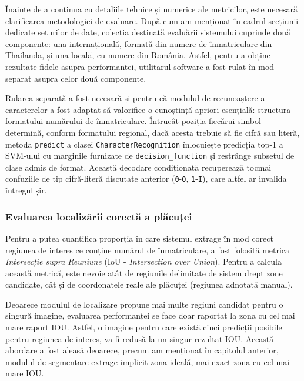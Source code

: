 Înainte de a continua cu detaliile tehnice și numerice ale metricilor, este necesară clarificarea metodologiei de evaluare. După cum am menționat în cadrul secțiunii dedicate seturilor de date, colecția destinată evaluării sistemului cuprinde două componente: una internațională, formată din numere de înmatriculare din Thailanda, și una locală, cu numere din România. Astfel, pentru a obține rezultate fidele asupra performanței, utilitarul software  a fost rulat în mod separat asupra celor două componente.

Rularea separată a fost necesară și pentru că modulul de recunoaștere a caracterelor a fost adaptat să valorifice o cunoștință apriori esențială: structura formatului numărului de înmatriculare. Întrucât poziția fiecărui simbol determină, conform formatului regional, dacă acesta trebuie să fie cifră sau literă, metoda \texttt{predict} a clasei \texttt{CharacterRecognition} înlocuiește predicția top-1 a SVM-ului cu marginile furnizate de \texttt{decision\_function} și restrânge subsetul de clase admis de format. Această decodare condiționată recuperează tocmai confuziile de tip cifră-literă discutate anterior (\texttt{0}-\texttt{O}, \texttt{1}-\texttt{I}), care altfel ar invalida întregul șir.

\subsubsection{Evaluarea localizării corectă a plăcuței}
\indent\par
Pentru a putea cuantifica proporția în care sistemul extrage în mod corect regiunea de interes ce conține numărul de înmatriculare, a fost folosită metrica \textit{Intersecție supra Reuniune} (IoU - \textit{Intersection over Union}). Pentru a calcula această metrică, este nevoie atât de regiunile delimitate de sistem drept zone candidate, cât și de coordonatele reale ale plăcuței (regiunea adnotată manual).

Deoarece modulul de localizare propune mai multe regiuni candidat pentru o singură imagine, evaluarea performanței se face doar raportat la zona cu cel mai mare raport IOU. Astfel, o imagine pentru care există cinci predicții posibile pentru regiunea de interes, va fi redusă la un singur rezultat IOU. Această abordare a fost aleasă deoarece, precum am menționat în capitolul anterior, modulul de segmentare extrage implicit zona ideală, mai exact zona cu cel mai mare IOU.

